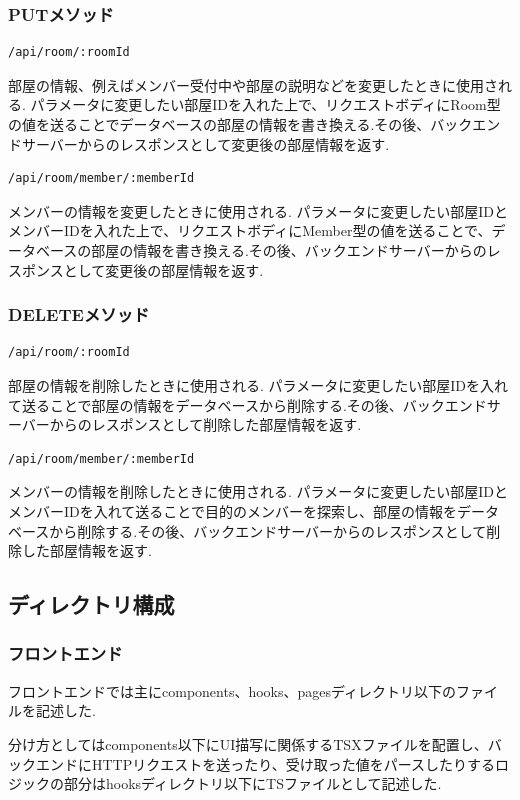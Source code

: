 \documentclass[submit,techrep]{ipsj}
\begin{document}
\subsubsection{PUTメソッド}
\begin{verbatim}
/api/room/:roomId
\end{verbatim}
部屋の情報、例えばメンバー受付中や部屋の説明などを変更したときに使用される.
パラメータに変更したい部屋IDを入れた上で、リクエストボディにRoom型の値を送ることでデータベースの部屋の情報を書き換える.その後、バックエンドサーバーからのレスポンスとして変更後の部屋情報を返す.

\begin{verbatim}
/api/room/member/:memberId
\end{verbatim}
メンバーの情報を変更したときに使用される.
パラメータに変更したい部屋IDとメンバーIDを入れた上で、リクエストボディにMember型の値を送ることで、データベースの部屋の情報を書き換える.その後、バックエンドサーバーからのレスポンスとして変更後の部屋情報を返す.

\subsubsection{DELETEメソッド}
\begin{verbatim}
/api/room/:roomId
\end{verbatim}
部屋の情報を削除したときに使用される.
パラメータに変更したい部屋IDを入れて送ることで部屋の情報をデータベースから削除する.その後、バックエンドサーバーからのレスポンスとして削除した部屋情報を返す.

\begin{verbatim}
/api/room/member/:memberId
\end{verbatim}
メンバーの情報を削除したときに使用される.
パラメータに変更したい部屋IDとメンバーIDを入れて送ることで目的のメンバーを探索し、部屋の情報をデータベースから削除する.その後、バックエンドサーバーからのレスポンスとして削除した部屋情報を返す.

\subsection{ディレクトリ構成}
\subsubsection{フロントエンド}
フロントエンドでは主にcomponents、hooks、pagesディレクトリ以下のファイルを記述した.

分け方としてはcomponents以下にUI描写に関係するTSXファイルを配置し、バックエンドにHTTPリクエストを送ったり、受け取った値をパースしたりするロジックの部分はhooksディレクトリ以下にTSファイルとして記述した.
\end{document}
